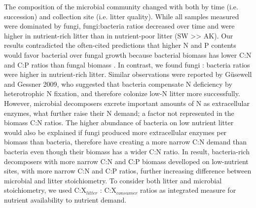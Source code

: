The composition of the microbial community changed with both by time (i.e. succession) and collection site (i.e. litter quality). While all samples measured were dominated by fungi, fungi:bacteria ratios decreased over time and were higher in nutrient-rich litter than in nutrient-poor litter (SW >> AK). Our results contradicted the often-cited predictions that higher N and P contents would favor bacterial over fungal growth because bacterial biomass has lower C:N and C:P ratios than fungal biomass \cite{Hodge2000}. In contrast, we found fungi : bacteria ratios were higher in nutrient-rich litter. Similar observations were reported by Güsewell and Gessner 2009, who suggested that bacteria compensate N deficiency by heterotrophic N fixation, and therefore colonize low-N litter more successfully. However, microbial decomposers excrete important amounts of N as extracellular enzymes, what further raise their N demand; a factor not represented in the biomass C:N ratios. The higher abundance of bacteria on low nutrient litter would also be explained if fungi produced more extracellular enzymes per biomass than bacteria, therefore have creating a more narrow C:N demand than bacteria even though their biomass has a wider C:N ratio. In result, bacteria-rich decomposers with more narrow C:N and C:P biomass develloped on low-nutrient sites, with more narrow C:N and C:P ratios, further increasing difference between microbial and litter stoichiometry. To consider both litter and microbial stoichiometry, we used C:X$_{litter}$ : C:X$_{consumer}$ ratios as integrated measure for nutrient availability to nutrient demand.




% 


